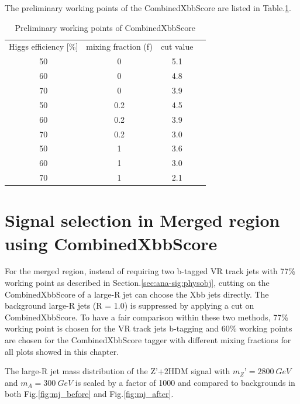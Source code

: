\par The preliminary working points of the CombinedXbbScore are listed in Table.\ref{tab:combxbb}.

\begin{table}
    \footnotesize{
        \begin{center}
            \begin{tabular}{ c |c |c |c}
                \hline
                \hline
                Higgs efficiency [\%] & mixing fraction (f) & cut value \\
                50 & 0 & 5.1 \\
                60 & 0 & 4.8 \\
                70 & 0 & 3.9 \\
                50 & 0.2 & 4.5 \\
                60 & 0.2 & 3.9 \\
                70 & 0.2 & 3.0 \\
                50 & 1 & 3.6 \\
                60 & 1 & 3.0 \\
                70 & 1 & 2.1 \\
                \hline
                \hline
            \end{tabular}
        \end{center}
        }
    \caption{Preliminary working points of CombinedXbbScore}
    \label{tab:combxbb}
\end{table}

\section{Signal selection in Merged region using CombinedXbbScore}

\par For the merged region, instead of requiring two b-tagged VR track jets with 77\% working point as described in Section.\ref{sec:ana-sig:physobj}, cutting on the CombinedXbbScore of a large-R jet can choose the Xbb jets directly.
The background large-R jets (R = 1.0) is suppressed by applying a cut on CombinedXbbScore. 
To have a fair comparison within these two methods, 77\% working point is chosen for the VR track jets b-tagging and 60\% working points are chosen for the CombinedXbbScore tagger with different mixing fractions for all plots showed in this chapter.                    

\par The large-R jet mass distribution of the Z’+2HDM signal with $m_Z’ = 2800~GeV$ and $m_A = 300~GeV$ is scaled by a factor of 1000 and compared to backgrounds in both Fig.\ref{fig:mj_before} and Fig.\ref{fig:mj_after}.   

